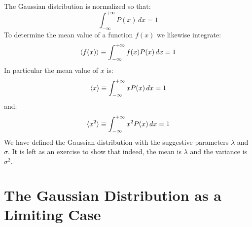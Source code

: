 \documentclass[12pt,oneside]{book}
\begin{document}
The Gaussian distribution is normalized so that:
\begin{displaymath}
\int_{-\infty}^{+\infty} P(x) \, dx = 1
\end{displaymath}
To determine the mean value of a function $f(x)$ we likewise integrate:
\begin{displaymath}
\braket{f(x)} \equiv \int_{-\infty}^{+\infty} f(x) P(x) \, dx = 1
\end{displaymath}
In particular the mean value of $x$ is:
\begin{displaymath}
\braket{x} \equiv \int_{-\infty}^{+\infty} x P(x) \, dx = 1
\end{displaymath}
and:
\begin{displaymath}
\braket{x^2} \equiv \int_{-\infty}^{+\infty} x^2 P(x) \, dx = 1
\end{displaymath}
We have defined the Gaussian distribution with the suggestive parameters $\lambda$ and $\sigma$.   It is left as an exercise to show that indeed, the mean is $\lambda$ and the variance is $\sigma^2$.

\section{The Gaussian Distribution as a Limiting Case}
\end{document}
